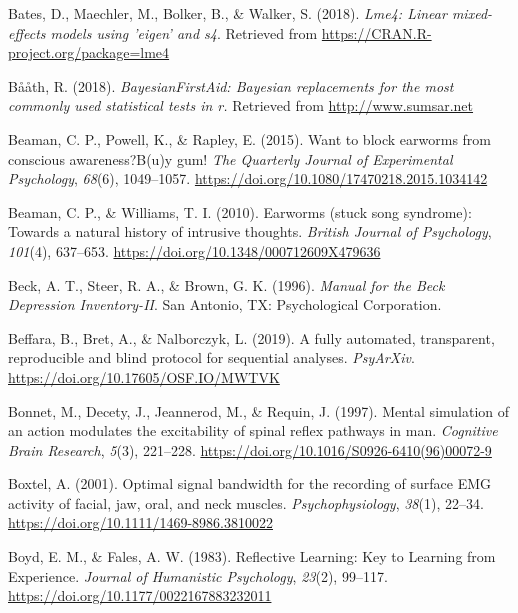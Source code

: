 \documentclass[a4paper,12pt,twoside,openright,oldfontcommands]{memoir}
\begin{document}
\leavevmode\hypertarget{ref-R-lme4}{}%
Bates, D., Maechler, M., Bolker, B., \& Walker, S. (2018). \emph{Lme4: Linear mixed-effects models using 'eigen' and s4}. Retrieved from \url{https://CRAN.R-project.org/package=lme4}

\leavevmode\hypertarget{ref-R-BayesianFirstAid}{}%
Bååth, R. (2018). \emph{BayesianFirstAid: Bayesian replacements for the most commonly used statistical tests in r.} Retrieved from \url{http://www.sumsar.net}

\leavevmode\hypertarget{ref-Beaman2015}{}%
Beaman, C. P., Powell, K., \& Rapley, E. (2015). Want to block earworms from conscious awareness?B(u)y gum! \emph{The Quarterly Journal of Experimental Psychology}, \emph{68}(6), 1049--1057. \url{https://doi.org/10.1080/17470218.2015.1034142}

\leavevmode\hypertarget{ref-Beaman2010}{}%
Beaman, C. P., \& Williams, T. I. (2010). Earworms (stuck song syndrome): Towards a natural history of intrusive thoughts. \emph{British Journal of Psychology}, \emph{101}(4), 637--653. \url{https://doi.org/10.1348/000712609X479636}

\leavevmode\hypertarget{ref-beck_manual_1996}{}%
Beck, A. T., Steer, R. A., \& Brown, G. K. (1996). \emph{Manual for the Beck Depression Inventory-II}. San Antonio, TX: Psychological Corporation.

\leavevmode\hypertarget{ref-beffara_fully_2019}{}%
Beffara, B., Bret, A., \& Nalborczyk, L. (2019). A fully automated, transparent, reproducible and blind protocol for sequential analyses. \emph{PsyArXiv}. \url{https://doi.org/10.17605/OSF.IO/MWTVK}

\leavevmode\hypertarget{ref-bonnet_mental_1997}{}%
Bonnet, M., Decety, J., Jeannerod, M., \& Requin, J. (1997). Mental simulation of an action modulates the excitability of spinal reflex pathways in man. \emph{Cognitive Brain Research}, \emph{5}(3), 221--228. \url{https://doi.org/10.1016/S0926-6410(96)00072-9}

\leavevmode\hypertarget{ref-boxtel_optimal_2001}{}%
Boxtel, A. (2001). Optimal signal bandwidth for the recording of surface EMG activity of facial, jaw, oral, and neck muscles. \emph{Psychophysiology}, \emph{38}(1), 22--34. \url{https://doi.org/10.1111/1469-8986.3810022}

\leavevmode\hypertarget{ref-boyd_reflective_1983}{}%
Boyd, E. M., \& Fales, A. W. (1983). Reflective Learning: Key to Learning from Experience. \emph{Journal of Humanistic Psychology}, \emph{23}(2), 99--117. \url{https://doi.org/10.1177/0022167883232011}
\end{document}
